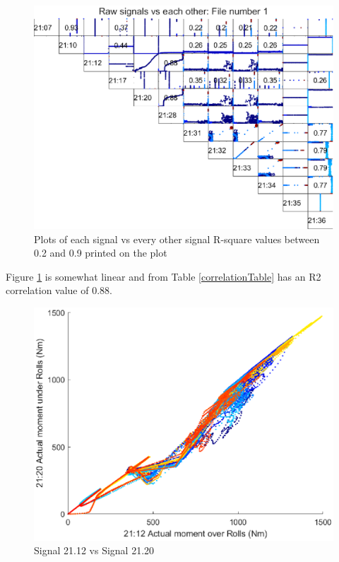 \documentclass{article}
\begin{document}
\begin{figure}[H]
    \centering
    \includegraphics[width=\textwidth, height=\textheight, keepaspectratio]{figures/RawSignalCorrelationsFile1.eps}
    \caption{Plots of each signal vs every other signal R-square values between 0.2 and 0.9 printed on the plot}
    \label{fig:RawSignalCorrelationsFile1}
\end{figure}

Figure \ref{fig:RawSignalCorrelationsFile1} is somewhat linear and from Table \ref{correlationTable} has an R2 correlation value of 0.88.

\begin{figure}[H]
    \centering
    \includegraphics[width=\textwidth, height=\textheight, keepaspectratio]{figures/Signal21_12vSignal21_20.eps}
    \caption{Signal 21.12 vs Signal 21.20}
    \label{fig:Signal21_12vSignal21_20}
\end{figure}	
\end{document}
